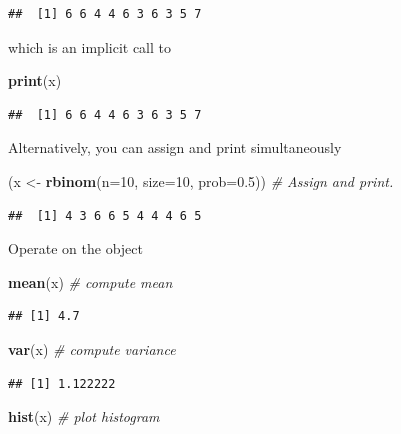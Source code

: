 \documentclass[]{book}
\newenvironment{Shaded}{\begin{snugshade}}{\end{snugshade}}
\newcommand{\KeywordTok}[1]{\textcolor[rgb]{0.13,0.29,0.53}{\textbf{{#1}}}}
\newcommand{\DataTypeTok}[1]{\textcolor[rgb]{0.13,0.29,0.53}{{#1}}}
\newcommand{\DecValTok}[1]{\textcolor[rgb]{0.00,0.00,0.81}{{#1}}}
\newcommand{\FloatTok}[1]{\textcolor[rgb]{0.00,0.00,0.81}{{#1}}}
\newcommand{\StringTok}[1]{\textcolor[rgb]{0.31,0.60,0.02}{{#1}}}
\newcommand{\CommentTok}[1]{\textcolor[rgb]{0.56,0.35,0.01}{\textit{{#1}}}}
\newcommand{\NormalTok}[1]{{#1}}
\theoremstyle{definition}
\theoremstyle{definition}
\theoremstyle{remark}
\begin{document}
\begin{verbatim}
##  [1] 6 6 4 4 6 3 6 3 5 7
\end{verbatim}

which is an implicit call to

\begin{Shaded}
\begin{Highlighting}[]
\KeywordTok{print}\NormalTok{(x)  }
\end{Highlighting}
\end{Shaded}

\begin{verbatim}
##  [1] 6 6 4 4 6 3 6 3 5 7
\end{verbatim}

Alternatively, you can assign and print simultaneously

\begin{Shaded}
\begin{Highlighting}[]
\NormalTok{(x <-}\StringTok{ }\KeywordTok{rbinom}\NormalTok{(}\DataTypeTok{n=}\DecValTok{10}\NormalTok{, }\DataTypeTok{size=}\DecValTok{10}\NormalTok{, }\DataTypeTok{prob=}\FloatTok{0.5}\NormalTok{))  }\CommentTok{# Assign and print.}
\end{Highlighting}
\end{Shaded}

\begin{verbatim}
##  [1] 4 3 6 6 5 4 4 4 6 5
\end{verbatim}

Operate on the object

\begin{Shaded}
\begin{Highlighting}[]
\KeywordTok{mean}\NormalTok{(x)  }\CommentTok{# compute mean}
\end{Highlighting}
\end{Shaded}

\begin{verbatim}
## [1] 4.7
\end{verbatim}

\begin{Shaded}
\begin{Highlighting}[]
\KeywordTok{var}\NormalTok{(x)  }\CommentTok{# compute variance}
\end{Highlighting}
\end{Shaded}

\begin{verbatim}
## [1] 1.122222
\end{verbatim}

\begin{Shaded}
\begin{Highlighting}[]
\KeywordTok{hist}\NormalTok{(x) }\CommentTok{# plot histogram}
\end{Highlighting}
\end{Shaded}
\end{document}
